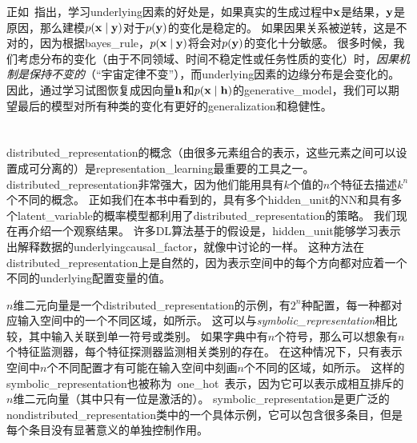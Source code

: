 
正如~\cite{Janzing-et-al-ICML2012}指出，学习\gls{underlying}因素的好处是，如果真实的生成过程中$\mathbf{x}$是结果，$\mathbf{y}$是原因，那么建模$p(\mathbf{x} \mid \mathbf{y})$对于$p(\mathbf{y})$的变化是稳定的。
如果因果关系被逆转，这是不对的，因为根据\gls{bayes_rule}，$p(\mathbf{x} \mid \mathbf{y})$将会对$p(\mathbf{y})$的变化十分敏感。
很多时候，我们考虑分布的变化（由于不同领域、时间不稳定性或任务性质的变化）时，\emph{因果机制是保持不变的}（``宇宙定律不变''），而\gls{underlying}因素的边缘分布是会变化的。
因此，通过学习试图恢复成因向量$\mathbf{h}$和$p(\mathbf{x} \mid \mathbf{h})$的\gls{generative_model}，我们可以期望最后的模型对所有种类的变化有更好的\gls{generalization}和稳健性。


\section{}
\label{sec:distributed_representation}

\gls{distributed_representation}的概念（由很多元素组合的表示，这些元素之间可以设置成可分离的）是\gls{representation_learning}最重要的工具之一。
\gls{distributed_representation}非常强大，因为他们能用具有$k$个值的$n$个特征去描述$k^n$个不同的概念。
正如我们在本书中看到的，具有多个\gls{hidden_unit}的\gls{NN}和具有多个\gls{latent_variable}的概率模型都利用了\gls{distributed_representation}的策略。
我们现在再介绍一个观察结果。
许多\gls{DL}算法基于的假设是，\gls{hidden_unit}能够学习表示出解释数据的\gls{underlying}\gls{causal_factor}，就像中讨论的一样。
这种方法在\gls{distributed_representation}上是自然的，因为表示空间中的每个方向都对应着一个不同的\gls{underlying}配置变量的值。


$n$维二元向量是一个\gls{distributed_representation}的示例，有$2^n$种配置，每一种都对应输入空间中的一个不同区域，如所示。
这可以与\emph{\gls{symbolic_representation}}相比较，其中输入关联到单一符号或类别。
如果字典中有$n$个符号，那么可以想象有$n$个特征监测器，每个特征探测器监测相关类别的存在。
在这种情况下，只有表示空间中$n$个不同配置才有可能在输入空间中刻画$n$个不同的区域，如所示。
这样的\gls{symbolic_representation}也被称为~\gls{one_hot}~表示，因为它可以表示成相互排斥的$n$维二元向量（其中只有一位是激活的）。
\gls{symbolic_representation}是更广泛的\gls{nondistributed_representation}类中的一个具体示例，它可以包含很多条目，但是每个条目没有显著意义的单独控制作用。

